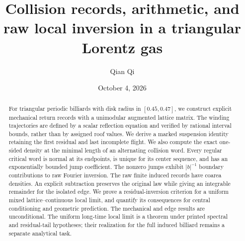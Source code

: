 \documentclass[11pt,reqno]{amsart}
\title[Collision records and raw local inversion]{Collision records, arithmetic, and raw local inversion in a triangular Lorentz gas}
\author{Qian Qi}
\date{October 4, 2026}
\numberwithin{equation}{section}
\theoremstyle{definition}\newtheorem{definition}[theorem]{Definition}
\theoremstyle{remark}\newtheorem{remark}[theorem]{Remark}
\begin{document}
\raggedbottom
\begin{abstract}
For triangular periodic billiards with disk radius in $[0.45,0.47]$, we construct explicit mechanical return records with a unimodular augmented lattice matrix. The winding trajectories are defined by a scalar reflection equation and verified by rational interval bounds, rather than by assigned roof values. We derive a marked suspension identity retaining the first residual and last incomplete flight. We also compute the exact one-sided density at the minimal length of an alternating collision word. Every regular critical word is normal at its endpoints, is unique for its center sequence, and has an exponentially bounded jump coefficient. The nonzero jumps exhibit $|b|^{-1}$ boundary contributions to raw Fourier inversion. The raw finite induced records have coarea densities. An explicit subtraction preserves the original law while giving an integrable remainder for the isolated edge. We prove a residual-inversion criterion for a uniform mixed lattice--continuous local limit, and quantify its consequences for central conditioning and geometric prediction. The mechanical and edge results are unconditional. The uniform long-time local limit is a theorem under printed spectral and residual-tail hypotheses; their realization for the full induced billiard remains a separate analytical task.
\end{abstract}
\maketitle









\end{document}

